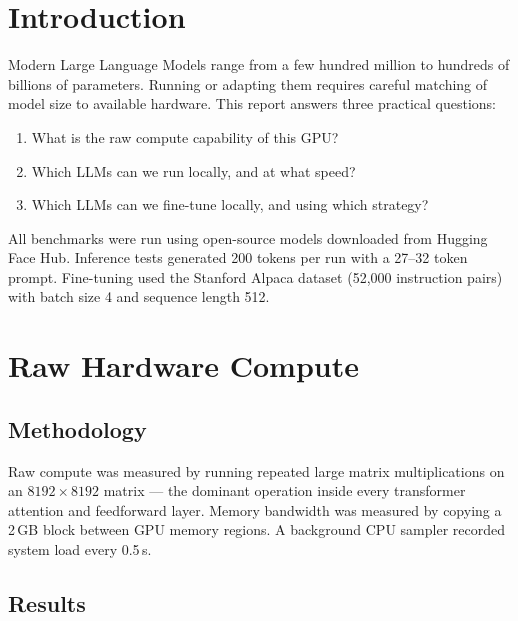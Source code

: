 \documentclass[11pt,a4paper]{article}
\begin{document}
\tableofcontents
\newpage

\section{Introduction}

Modern Large Language Models range from a few hundred million to hundreds of billions of
parameters. Running or adapting them requires careful matching of model size to available
hardware. This report answers three practical questions:

\begin{enumerate}
  \item What is the raw compute capability of this GPU?
  \item Which LLMs can we run locally, and at what speed?
  \item Which LLMs can we fine-tune locally, and using which strategy?
\end{enumerate}

All benchmarks were run using open-source models downloaded from Hugging Face Hub.
Inference tests generated 200 tokens per run with a 27--32 token prompt.
Fine-tuning used the Stanford Alpaca dataset (52,000 instruction pairs) with
batch size 4 and sequence length 512.

\section{Raw Hardware Compute}

\subsection{Methodology}
Raw compute was measured by running repeated large matrix multiplications on an
$8192 \times 8192$ matrix — the dominant operation inside every transformer attention
and feedforward layer. Memory bandwidth was measured by copying a 2\,GB block between
GPU memory regions. A background CPU sampler recorded system load every 0.5\,s.

\subsection{Results}
\end{document}
